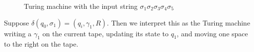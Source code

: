 \documentclass{fkpset}
\begin{document}
\begin{figure}[H]
  \caption{Turing machine with the input string $\sigma_1 \sigma_2
    \sigma_3 \sigma_4 \sigma_5$}
\end{figure}
Suppose $\delta(q_0, \sigma_1) = (q_i, \gamma_1, R)$. Then we
interpret this as the Turing machine writing a $\gamma_1$ on the
current tape, updating its state to $q_1$, and moving one space to the right on the tape.
\end{document}
